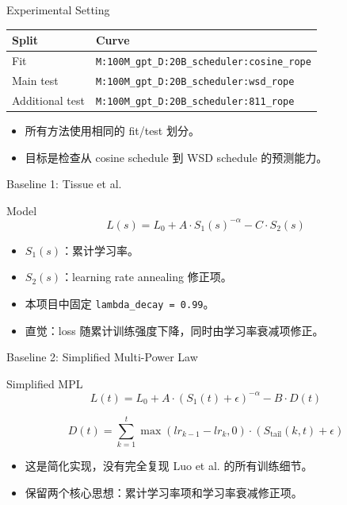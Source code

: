 \documentclass[aspectratio=169,11pt]{beamer}
\begin{document}
\begin{frame}{Experimental Setting}
  \begin{table}
    \centering
    \begin{tabular}{ll}
      \toprule
      Split & Curve \\
      \midrule
      Fit & \texttt{M:100M\_gpt\_D:20B\_scheduler:cosine\_rope} \\
      Main test & \texttt{M:100M\_gpt\_D:20B\_scheduler:wsd\_rope} \\
      Additional test & \texttt{M:100M\_gpt\_D:20B\_scheduler:811\_rope} \\
      \bottomrule
    \end{tabular}
  \end{table}
  \vspace{0.3cm}
  \begin{itemize}
    \item 所有方法使用相同的 fit/test 划分。
    \item 目标是检查从 cosine schedule 到 WSD schedule 的预测能力。
  \end{itemize}
\end{frame}

\begin{frame}{Baseline 1: Tissue et al.}
  \begin{block}{Model}
    \[
      L(s) = L_0 + A\cdot S_1(s)^{-\alpha} - C\cdot S_2(s)
    \]
  \end{block}
  \begin{itemize}
    \item $S_1(s)$：累计学习率。
    \item $S_2(s)$：learning rate annealing 修正项。
    \item 本项目中固定 \texttt{lambda\_decay = 0.99}。
    \item 直觉：loss 随累计训练强度下降，同时由学习率衰减项修正。
  \end{itemize}
\end{frame}

\begin{frame}{Baseline 2: Simplified Multi-Power Law}
  \begin{block}{Simplified MPL}
    \[
      L(t) = L_0 + A\cdot(S_1(t)+\epsilon)^{-\alpha} - B\cdot D(t)
    \]
  \end{block}
  \[
    D(t) = \sum_{k=1}^{t} \max(lr_{k-1} - lr_k, 0)
           \cdot(S_{\text{tail}}(k,t)+\epsilon)
  \]
  \begin{itemize}
    \item 这是简化实现，没有完全复现 Luo et al. 的所有训练细节。
    \item 保留两个核心思想：累计学习率项和学习率衰减修正项。
  \end{itemize}
\end{frame}
\end{document}
